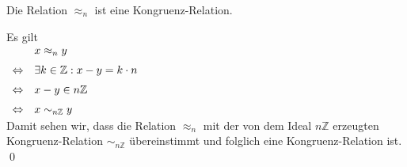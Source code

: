 \begin{Satz}
  Die Relation $\approx_n$ ist eine Kongruenz-Relation.
\end{Satz}

\proof
Es gilt 
\\[0.2cm]
\hspace*{1.3cm}
$
\begin{array}[t]{cl}
                & x \approx_n y                                \\[0.2cm]
\Leftrightarrow & \exists k \in \mathbb{Z}: x - y = k \cdot n  \\[0.2cm]
\Leftrightarrow & x - y \in n\mathbb{Z}                        \\[0.2cm]
\Leftrightarrow & x \sim_{n\mathbb{Z}} y 
\end{array}
$
\\[0.2cm]
Damit sehen wir, dass die Relation $\approx_n$ mit der von dem Ideal $n\mathbb{Z}$
erzeugten Kongruenz-Relation $\sim_{n\mathbb{Z}}$ übereinstimmt und folglich
eine Kongruenz-Relation ist.  \qed

